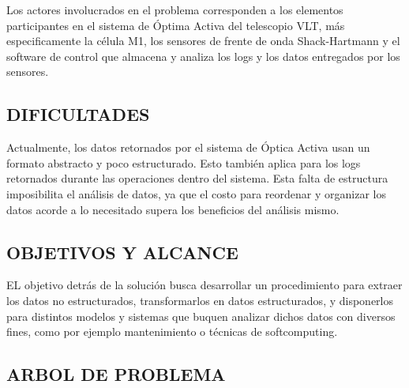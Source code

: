 Los actores involucrados en el problema corresponden a los elementos participantes en el sistema de Óptima Activa del telescopio VLT, más especificamente la célula M1, los sensores de frente de onda Shack-Hartmann y el software de control que almacena y analiza los logs y los datos entregados por los sensores\cite{eso2011vlt}.

\subsection{DIFICULTADES}

Actualmente, los datos retornados por el sistema de Óptica Activa usan un formato abstracto y poco estructurado. Esto también aplica para los logs retornados durante las operaciones dentro del sistema.
Esta falta de estructura imposibilita el análisis de datos, ya que el costo para reordenar y organizar los datos acorde a lo necesitado supera los beneficios del análisis mismo. 

\subsection{OBJETIVOS Y ALCANCE}

EL objetivo detrás de la solución busca desarrollar un procedimiento para extraer los datos no estructurados, transformarlos en datos estructurados, y disponerlos para distintos modelos y sistemas
que buquen analizar dichos datos con diversos fines, como por ejemplo mantenimiento o técnicas de softcomputing.

\subsection{ARBOL DE PROBLEMA}
